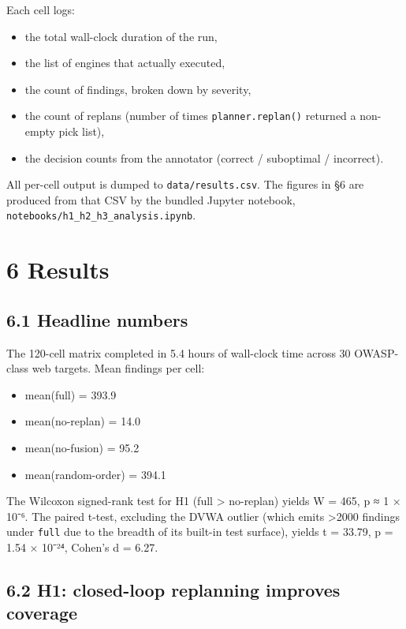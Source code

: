 \documentclass[
]{article}
\providecommand{\tightlist}{%
  \setlength{\itemsep}{0pt}\setlength{\parskip}{0pt}}
\begin{document}
Each cell logs:

\begin{itemize}
\tightlist
\item
  the total wall-clock duration of the run,
\item
  the list of engines that actually executed,
\item
  the count of findings, broken down by severity,
\item
  the count of replans (number of times \texttt{planner.replan()}
  returned a non-empty pick list),
\item
  the decision counts from the annotator (correct / suboptimal /
  incorrect).
\end{itemize}

All per-cell output is dumped to \texttt{data/results.csv}. The figures
in §6 are produced from that CSV by the bundled Jupyter notebook,
\texttt{notebooks/h1\_h2\_h3\_analysis.ipynb}.

\section{6 Results}\label{results}

\subsection{6.1 Headline numbers}\label{headline-numbers}

The 120-cell matrix completed in 5.4 hours of wall-clock time across 30
OWASP-class web targets. Mean findings per cell:

\begin{itemize}
\tightlist
\item
  mean(full) = 393.9
\item
  mean(no-replan) = 14.0
\item
  mean(no-fusion) = 95.2
\item
  mean(random-order) = 394.1
\end{itemize}

The Wilcoxon signed-rank test for H1 (full \textgreater{} no-replan)
yields W = 465, p ≈ 1 × 10⁻⁶. The paired t-test, excluding the DVWA
outlier (which emits \textgreater2000 findings under \texttt{full} due
to the breadth of its built-in test surface), yields t = 33.79, p = 1.54
× 10⁻²⁴, Cohen's d = 6.27.

\subsection{6.2 H1: closed-loop replanning improves
coverage}\label{h1-closed-loop-replanning-improves-coverage}
\end{document}
